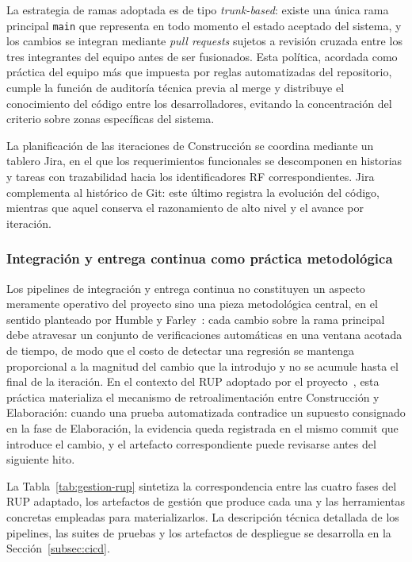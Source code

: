 La estrategia de ramas adoptada es de tipo \textit{trunk-based}:
existe una única rama principal \texttt{main} que representa en todo
momento el estado aceptado del sistema, y los cambios se integran
mediante \textit{pull requests} sujetos a revisión cruzada entre los
tres integrantes del equipo antes de ser fusionados. Esta política,
acordada como práctica del equipo más que impuesta por reglas
automatizadas del repositorio, cumple la función de auditoría técnica
previa al merge y distribuye el conocimiento del código entre los
desarrolladores, evitando la concentración del criterio sobre zonas
específicas del sistema.

La planificación de las iteraciones de Construcción se coordina
mediante un tablero Jira, en el que los requerimientos funcionales
se descomponen en historias y tareas con trazabilidad hacia los
identificadores RF correspondientes. Jira complementa al histórico
de Git: este último registra la evolución del código, mientras que
aquel conserva el razonamiento de alto nivel y el avance por
iteración.

\subsubsection{Integración y entrega continua como práctica
metodológica}

Los pipelines de integración y entrega continua no constituyen un
aspecto meramente operativo del proyecto sino una pieza metodológica
central, en el sentido planteado por Humble y
Farley~\cite{humble2010cd}: cada cambio sobre la rama principal
debe atravesar un conjunto de verificaciones automáticas en una
ventana acotada de tiempo, de modo que el costo de detectar una
regresión se mantenga proporcional a la magnitud del cambio que la
introdujo y no se acumule hasta el final de la iteración. En el
contexto del RUP adoptado por el proyecto~\cite{kruchten2003rup},
esta práctica materializa el mecanismo de retroalimentación entre
Construcción y Elaboración: cuando una prueba automatizada contradice
un supuesto consignado en la fase de Elaboración, la evidencia queda
registrada en el mismo commit que introduce el cambio, y el
artefacto correspondiente puede revisarse antes del siguiente hito.

La Tabla~\ref{tab:gestion-rup} sintetiza la correspondencia entre
las cuatro fases del RUP adaptado, los artefactos de gestión que
produce cada una y las herramientas concretas empleadas para
materializarlos. La descripción técnica detallada de los pipelines,
las suites de pruebas y los artefactos de despliegue se desarrolla
en la Sección~\ref{subsec:cicd}.

